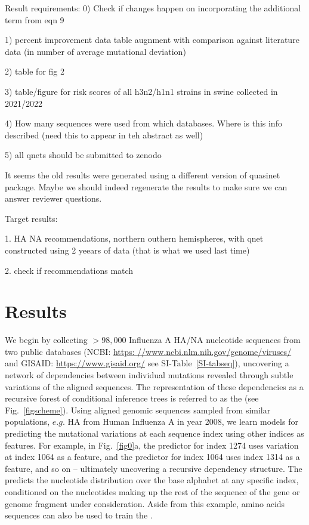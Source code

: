 \documentclass[onecolumn, compsoc,10pt]{IEEEtran}
\begin{document}
  {\color{magenta}
    Result requirements:
    0) Check if changes happen on incorporating the additional term from eqn 9
    
    1) percent improvement data table augnment with comparison against literature data (in number of average mutational deviation)
    
    2) table for fig 2
    
    3) table/figure for risk scores of all h3n2/h1n1 strains in swine collected in 2021/2022
    
    4) How many sequences were used from which databases. Where is this info described (need this to appear in teh abstract as well)
    
    5) all qnets should be submitted to zenodo


    It seems the old results were generated using a different version of quasinet package. Maybe we should indeed regenerate the results to make sure we can answer reviewer questions.

    Target results:

    1. HA NA recommendations, northern outhern hemispheres, with qnet constructed using 2 yeears of data (that is what we used last time)

    2. check if recommendations match


  }



 

    

\section*{Results}

We begin by collecting  $>98,000$ Influenza A HA/NA nucleotide sequences from two public databases (NCBI:  \href{https://www.ncbi.nlm.nih.gov/genome/viruses/}{https: //www.ncbi.nlm.nih.gov/genome/viruses/}
and GISAID:  \href{https://www.gisaid.org/}{https://www.gisaid.org/}
see SI-Table~\ref{SI-tabseq}), uncovering a network of  dependencies between individual mutations revealed through subtle variations of the aligned sequences. The representation of these dependencies as a recursive forest of conditional inference trees is referred to as the \enet (see Fig.~\ref{figscheme}). 
%
Using aligned genomic sequences sampled from  similar populations, $e.g.$ HA from Human Influenza A in year 2008, we  learn models for predicting the mutational variations at each sequence index using other indices  as features. For example, in Fig.~\ref{fig0}a,  the predictor for index 1274 uses variation at index 1064 as a feature, and the predictor for index 1064 uses index 1314 as a feature, and so on -- ultimately uncovering a recursive dependency structure. The \qnet predicts the nucleotide distribution over the base alphabet at any specific index, conditioned on the nucleotides making up the rest of the sequence of the gene or genome fragment under consideration. Aside from this example, amino acids sequences can also be used to train the \qnet.
\end{document}
